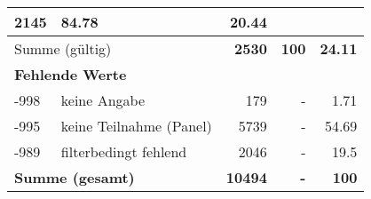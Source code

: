 \begin{longtable}{lXrrr}
       \num{2145} &
       \num[round-mode=places,round-precision=2]{84,78} &
         \num[round-mode=places,round-precision=2]{20,44} \\
     \midrule
     \multicolumn{2}{l}{Summe (gültig)} &
       \textbf{\num{2530}} &
     \textbf{100} &
       \textbf{\num[round-mode=places,round-precision=2]{24,11}} \\
     \multicolumn{5}{l}{\textbf{Fehlende Werte}}\\
       -998 &
       keine Angabe &
         \num{179} &
        - &
         \num[round-mode=places,round-precision=2]{1,71} \\
       -995 &
       keine Teilnahme (Panel) &
         \num{5739} &
        - &
         \num[round-mode=places,round-precision=2]{54,69} \\
       -989 &
       filterbedingt fehlend &
         \num{2046} &
        - &
         \num[round-mode=places,round-precision=2]{19,5} \\
     \midrule
     \multicolumn{2}{l}{\textbf{Summe (gesamt)}} &
          \textbf{\num{10494}} &
        \textbf{-} &
        \textbf{100} \\
     \bottomrule
     \end{longtable}
     
